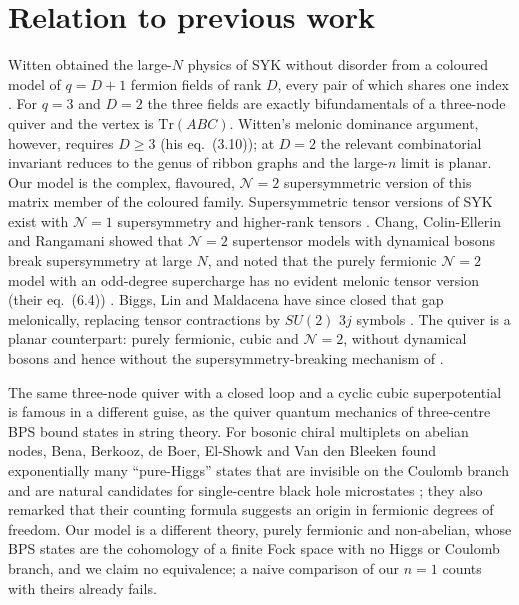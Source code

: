 \documentclass[10pt]{article}
\newcommand{\Tr}{\mathrm{Tr}}
\begin{document}
\section{Relation to previous work}\label{sec:lit}

Witten obtained the large-$N$ physics of SYK without disorder from a coloured model of $q=D+1$ fermion fields of
rank $D$, every pair of which shares one index \cite{Witten}. For $q=3$ and $D=2$ the three fields are exactly
bifundamentals of a three-node quiver and the vertex is $\Tr(ABC)$. Witten's melonic dominance argument, however,
requires $D\ge3$ (his eq.~(3.10)); at $D=2$ the relevant combinatorial invariant reduces to the genus of ribbon
graphs and the large-$n$ limit is planar. Our model is the complex, flavoured, $\mathcal N=2$ supersymmetric version
of this matrix member of the coloured family. Supersymmetric tensor versions of SYK exist with $\mathcal N=1$ supersymmetry and
higher-rank tensors \cite{PSV}. Chang, Colin-Ellerin and Rangamani showed that $\mathcal N=2$ supertensor models with
dynamical bosons break supersymmetry at large $N$, and noted that the purely fermionic $\mathcal N=2$ model with
an odd-degree supercharge has no evident melonic tensor version (their eq.~(6.4)) \cite{CCR}. Biggs, Lin and
Maldacena have since closed that gap melonically, replacing tensor contractions by $SU(2)$ $3j$ symbols
\cite{BLM}. The quiver is a planar counterpart: purely fermionic, cubic and $\mathcal N=2$, without dynamical
bosons and hence without the supersymmetry-breaking mechanism of \cite{CCR}.

The same three-node quiver with a closed loop and a cyclic cubic superpotential is famous in a different guise, as
the quiver quantum mechanics of three-centre BPS bound states in string theory. For bosonic chiral multiplets on
abelian nodes, Bena, Berkooz, de Boer, El-Showk and Van den Bleeken found exponentially many ``pure-Higgs'' states
that are invisible on the Coulomb branch and are natural candidates for single-centre black hole microstates
\cite{Bena}; they also remarked that their counting formula suggests an origin in fermionic degrees of freedom.
Our model is a different theory, purely fermionic and non-abelian, whose BPS states are the cohomology of a finite
Fock space with no Higgs or Coulomb branch, and we claim no equivalence; a naive comparison of our $n=1$ counts with
theirs already fails.
\end{document}
